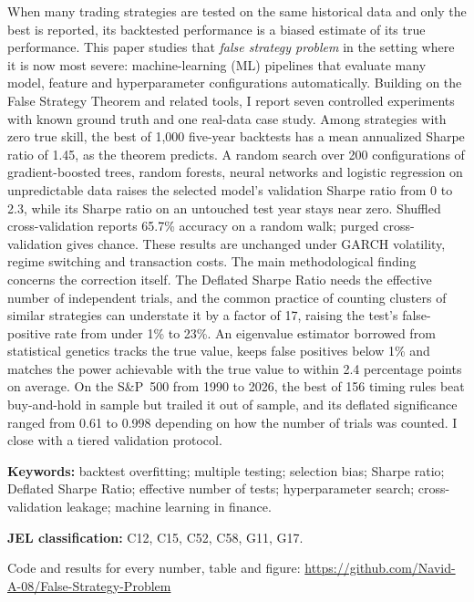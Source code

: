 \documentclass[11pt]{article}
\begin{document}
\begin{titlepage}
\begin{center}
\begin{minipage}{0.86\textwidth}
When many trading strategies are tested on the same historical data and only the best is reported, its backtested performance is a biased estimate of its true performance. This paper studies that \emph{false strategy problem} in the setting where it is now most severe: machine-learning (ML) pipelines that evaluate many model, feature and hyperparameter configurations automatically. Building on the False Strategy Theorem and related tools, I report seven controlled experiments with known ground truth and one real-data case study. Among strategies with zero true skill, the best of 1{,}000 five-year backtests has a mean annualized Sharpe ratio of 1.45, as the theorem predicts. A random search over 200 configurations of gradient-boosted trees, random forests, neural networks and logistic regression on unpredictable data raises the selected model's validation Sharpe ratio from 0 to 2.3, while its Sharpe ratio on an untouched test year stays near zero. Shuffled cross-validation reports 65.7\% accuracy on a random walk; purged cross-validation gives chance. These results are unchanged under GARCH volatility, regime switching and transaction costs. The main methodological finding concerns the correction itself. The Deflated Sharpe Ratio needs the effective number of independent trials, and the common practice of counting clusters of similar strategies can understate it by a factor of 17, raising the test's false-positive rate from under 1\% to 23\%. An eigenvalue estimator borrowed from statistical genetics tracks the true value, keeps false positives below 1\% and matches the power achievable with the true value to within 2.4 percentage points on average. On the S\&P~500 from 1990 to 2026, the best of 156 timing rules beat buy-and-hold in sample but trailed it out of sample, and its deflated significance ranged from 0.61 to 0.998 depending on how the number of trials was counted. I close with a tiered validation protocol.

\vspace{12pt}
\noindent\textbf{Keywords:} backtest overfitting; multiple testing; selection bias; Sharpe ratio; Deflated Sharpe Ratio; effective number of tests; hyperparameter search; cross-validation leakage; machine learning in finance.

\vspace{6pt}
\noindent\textbf{JEL classification:} C12, C15, C52, C58, G11, G17.
\end{minipage}
\end{center}
\vfill
\begin{center}
\footnotesize Code and results for every number, table and figure: \url{https://github.com/Navid-A-08/False-Strategy-Problem}
\end{center}
\end{titlepage}
\end{document}
